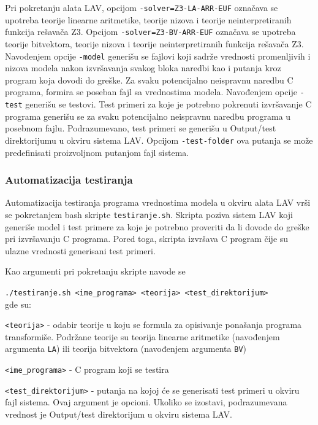 \documentclass[12pt,oneside]{memoir}
\begin{document}
Pri pokretanju alata LAV, opcijom \texttt{-solver=Z3-LA-ARR-EUF} označava se upotreba teorije linearne aritmetike, teorije nizova i teorije neinterpretiranih funkcija rešavača Z3. Opcijom \texttt{-solver=Z3-BV-ARR-EUF} označava se upotreba teorije bitvektora, teorije nizova i teorije neinterpretiranih funkcija rešavača Z3. Navođenjem opcije \texttt{-model} generišu se fajlovi koji sadrže vrednosti promenljivih i nizova modela nakon izvršavanja svakog bloka naredbi kao i putanja kroz program koja dovodi do greške. Za svaku potencijalno neispravnu naredbu C programa, formira se poseban fajl sa vrednostima modela. Navođenjem opcije \texttt{-test} generišu se testovi. Test primeri za koje je potrebno pokrenuti izvršavanje C programa generišu se za svaku potencijalno neispravnu naredbu programa u posebnom fajlu. Podrazumevano, test primeri se generišu u Output/test direktorijumu u okviru sistema LAV. Opcijom \texttt{-test-folder} ova putanja se može predefinisati proizvoljnom putanjom fajl sistema.

\par
\subsubsection{Automatizacija testiranja}
Automatizacija testiranja programa vrednostima modela u okviru alata LAV vrši se pokretanjem bash skripte \texttt{testiranje.sh}. Skripta poziva sistem LAV koji generiše model i test primere za koje je potrebno proveriti da li dovode do greške pri izvršavanju C programa. Pored toga, skripta izvršava C program čije su ulazne vrednosti generisani test primeri.

Kao argumenti pri pokretanju skripte navode se 
\par
\texttt{./testiranje.sh <ime\_programa> <teorija> <test\_direktorijum>}
\\ gde su:
\begin{description}
   \item \texttt{<teorija>} - odabir teorije u koju se formula za opisivanje ponašanja programa transformiše. Podržane teorije su teorija linearne aritmetike (navođenjem argumenta \texttt{LA}) ili teorija bitvektora (navođenjem argumenta \texttt{BV})
  \item \texttt{<ime\_programa>} - C program koji se testira
  \item \texttt{<test\_direktorijum>} - putanja na kojoj će se generisati test primeri u okviru fajl sistema. Ovaj argument je opcioni. Ukoliko se izostavi, podrazumevana vrednost je Output/test direktorijum u okviru sistema LAV.
\end{description}
 
\end{document}

